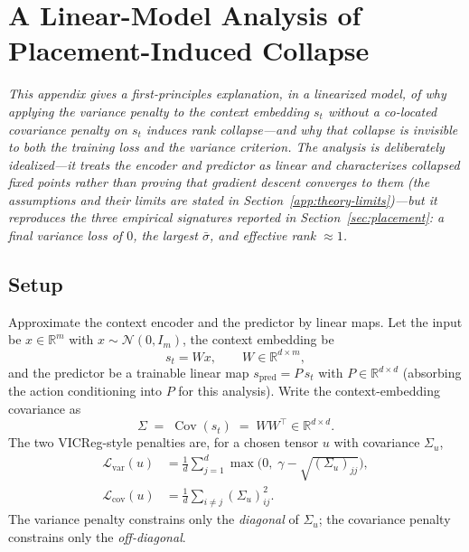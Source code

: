 \chapter{A Linear-Model Analysis of Placement-Induced Collapse}
\label{app:theory}

\emph{This appendix gives a first-principles explanation, in a linearized
model, of why applying the variance penalty to the context embedding $s_t$
without a co-located covariance penalty on $s_t$ induces rank collapse---and
why that collapse is invisible to both the training loss and the variance
criterion. The analysis is deliberately idealized---it treats the encoder and
predictor as linear and characterizes collapsed fixed points rather than
proving that gradient descent converges to them (the assumptions and their
limits are stated in Section~\ref{app:theory-limits})---but it reproduces the
three empirical signatures reported in Section~\ref{sec:placement}: a final
variance loss of $0$, the largest $\bar\sigma$, and effective rank $\approx 1$.}

\section{Setup}
Approximate the context encoder and the predictor by linear maps. Let the
input be $x \in \mathbb{R}^{m}$ with $x \sim \mathcal{N}(0, I_m)$, the context
embedding be
\begin{equation}
    s_t = W x, \qquad W \in \mathbb{R}^{d \times m},
\end{equation}
and the predictor be a trainable linear map $s_{\text{pred}} = P\,s_t$ with
$P \in \mathbb{R}^{d \times d}$ (absorbing the action conditioning into $P$ for
this analysis). Write the context-embedding covariance as
\begin{equation}
    \Sigma \;=\; \operatorname{Cov}(s_t) \;=\; W W^{\top} \in \mathbb{R}^{d \times d}.
\end{equation}
The two VICReg-style penalties are, for a chosen tensor $u$ with covariance
$\Sigma_u$,
\begin{align}
    \mathcal{L}_{\text{var}}(u) &= \frac{1}{d}\sum_{j=1}^{d}
        \max\!\big(0,\; \gamma - \sqrt{(\Sigma_u)_{jj}}\big), \\
    \mathcal{L}_{\text{cov}}(u) &= \frac{1}{d}\sum_{i \neq j} (\Sigma_u)_{ij}^{2}.
\end{align}
The variance penalty constrains only the \emph{diagonal} of $\Sigma_u$; the
covariance penalty constrains only the \emph{off-diagonal}.

